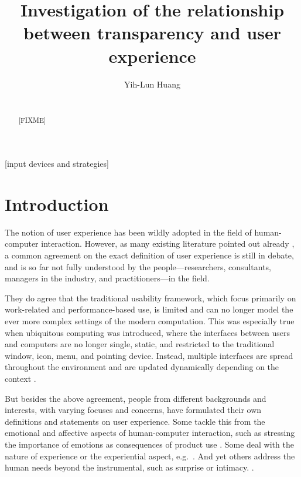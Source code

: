 \documentclass{acm_proc_article-sp}
\begin{document}
\title{Investigation of the relationship between transparency and user
  experience}

\author{
\alignauthor Yih-Lun Huang\\
\\
}

\maketitle
\begin{abstract}
[FIXME]
\end{abstract}


[input devices and strategies]




\section{Introduction}
\label{sec:introduction}
The notion of user experience has been wildly adopted in the field of
human-computer interaction. However, as many existing literature
pointed out already \citep{ux:hassenzahl, ux:law}, a common agreement
on the exact definition of user experience is still in debate, and is
so far not fully understood by the people---researchers, consultants,
managers in the industry, and practitioners---in the field.

They do agree that the traditional usability framework, which focus
primarily on work-related and performance-based use, is limited and
can no longer model the ever more complex settings of the modern
computation. This was especially true when ubiquitous computing was
introduced, where the interfaces between users and computers are no
longer single, static, and restricted to the traditional window, icon,
menu, and pointing device. Instead, multiple interfaces are spread
throughout the environment and are updated dynamically depending on
the context \citep{windows:bolter}.

But besides the above agreement, people from different backgrounds and
interests, with varying focuses and concerns, have formulated their
own definitions and statements on user experience. Some tackle this
from the emotional and affective aspects of human-computer
interaction, such as stressing the importance of emotions as
consequences of product use \citep{emotions:desmet}. Some deal with
the nature of experience or the experiential aspect,
e.g.\ \citet{experience:forlizzi}. And yet others address the human
needs beyond the instrumental, such as surprise or intimacy.
\citep{alternatives:gaver}.
\end{document}
